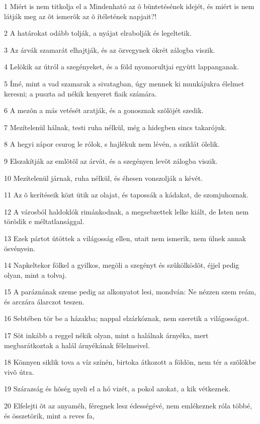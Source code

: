 \par 1 Miért is nem titkolja el a Mindenható az õ büntetésének idejét, és miért is nem látják meg az õt ismerõk az õ ítéletének napjait?!
\par 2 A határokat odább tolják, a nyájat elrabolják és legeltetik.
\par 3 Az árvák szamarát elhajtják, és az özvegynek ökrét zálogba viszik.
\par 4 Lelökik az útról a szegényeket, és a föld nyomorultjai együtt lappanganak.
\par 5 Ímé, mint a vad szamarak a sivatagban, úgy mennek ki munkájukra élelmet keresni; a puszta ad nékik kenyeret fiaik számára.
\par 6 A mezõn a más vetését aratják, és a gonosznak szõlõjét szedik.
\par 7 Mezítelenül hálnak, testi ruha nélkül, még a hidegben sincs takarójuk.
\par 8 A hegyi zápor csurog le rólok, s hajlékuk nem lévén, a sziklát ölelik.
\par 9 Elszakítják az emlõtõl az árvát, és a szegényen levõt zálogba viszik.
\par 10 Mezítelenül járnak, ruha nélkül, és éhesen vonszolják a kévét.
\par 11 Az õ kerítéseik közt ütik az olajat, és tapossák a kádakat, de szomjuhoznak.
\par 12 A városból haldoklók rimánkodnak, a megsebzettek lelke kiált, de Isten nem törõdik e méltatlansággal.
\par 13 Ezek pártot ütöttek a világosság ellen, utait nem ismerik, nem ülnek annak ösvényein.
\par 14 Napkeltekor fölkel a gyilkos, megöli a szegényt és szûkölködõt, éjjel pedig olyan, mint a tolvaj.
\par 15 A paráznának szeme pedig az alkonyatot lesi, mondván: Ne nézzen szem reám, és arczára álarczot teszen.
\par 16 Sebtében tör be a házakba; nappal elzárkóznak, nem szeretik a világosságot.
\par 17 Sõt inkább a reggel nékik olyan, mint a halálnak árnyéka, mert megbarátkoztak a halál árnyékának félelmeivel.
\par 18 Könnyen siklik tova a víz színén, birtoka átkozott a földön, nem tér a szõlõkbe vivõ útra.
\par 19 Szárazság és hõség nyeli el a hó vizét, a pokol azokat, a kik vétkeznek.
\par 20 Elfelejti õt az anyaméh, féregnek lesz édességévé, nem emlékeznek róla többé, és összetörik, mint a reves fa,
